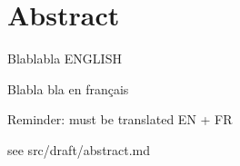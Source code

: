 \chapter*{Abstract}

Blablabla ENGLISH

Blabla bla en français


Reminder: must be translated EN + FR


see src/draft/abstract.md
\newpage
